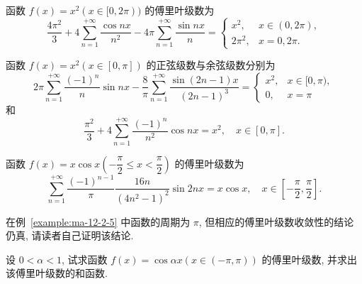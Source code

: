 \begin{example}\label{example:ma-12-2-3}
函数 $f(x)=x^2(x\in[0,2\pi))$ 的傅里叶级数为
\[
  \frac{4\pi^2}{3}+4\sum_{n=1}^{+\infty}\frac{\cos nx}{n^2}
  -4\pi\sum_{n=1}^{+\infty}\frac{\sin nx}{n}
  =
  \begin{cases}
    x^2, & x\in(0,2\pi),\\
    2\pi^2, & x=0,2\pi.
  \end{cases}
\]
\end{example}


\begin{example}\label{example:ma-12-2-4}
函数 $f(x)=x^2(x\in[0,\pi])$ 的正弦级数与余弦级数分别为
\[
  2\pi\sum_{n=1}^{+\infty}\frac{(-1)^n}{n}\sin nx
  -\frac8\pi\sum_{n=1}^{+\infty}\frac{\sin(2n-1)x}{(2n-1)^3}
  =
  \begin{cases}
    x^2, & x\in[0,\pi),\\
    0, & x=\pi
  \end{cases}
\]
和
\[
  \frac{\pi^2}{3}+4\sum_{n=1}^{+\infty}\frac{(-1)^n}{n^2}\cos nx=x^2,\quad x\in[0,\pi].
\]
\end{example}


\begin{example}\label{example:ma-12-2-5}
函数 $f(x)=x\cos x\left(-\dfrac{\pi}{2}\leqslant x<\dfrac{\pi}{2}\right)$ 的傅里叶级数为
\[
  \sum_{n=1}^{+\infty}\frac{(-1)^{n-1}}{\pi}\frac{16n}{(4n^2-1)^2}\sin2nx
  =x\cos x,\quad x\in\left[-\frac{\pi}{2},\frac{\pi}{2}\right].
\]
\end{example}


\begin{remark}\label{remark:ma-12-source-31}
在例~\ref{example:ma-12-2-5} 中函数的周期为 $\pi$, 但相应的傅里叶级数收敛性的结论仍真, 请读者自己证明该结论.
\end{remark}


\begin{example}\label{example:ma-12-2-6}
设 $0<\alpha<1$, 试求函数 $f(x)=\cos\alpha x(x\in(-\pi,\pi))$ 的傅里叶级数, 并求出该傅里叶级数的和函数.
\end{example}


